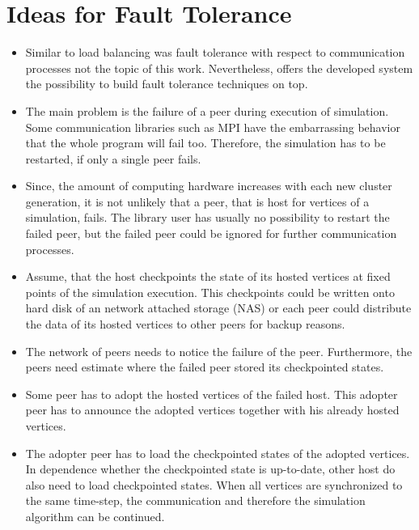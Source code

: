 \section*{Ideas for Fault Tolerance}
\begin{itemize}
\item Similar to load balancing was fault tolerance with respect to
  communication processes not the topic of this work. Nevertheless,
  offers the developed system the possibility to build fault tolerance
  techniques on top.

\item The main problem is the failure of a peer during execution of simulation.
  Some communication libraries such as MPI have the embarrassing behavior
  that the whole program will fail too. Therefore, the simulation has to be
  restarted, if only a single peer fails.

\item Since, the amount of computing hardware increases with each new
  cluster generation, it is not unlikely that a peer, that is host for
  vertices of a simulation, fails. The library user has usually no
  possibility to restart the failed peer, but the failed peer could be
  ignored for further communication processes.

\item Assume, that the host checkpoints the state of its hosted
  vertices at fixed points of the simulation execution. This
  checkpoints could be written onto hard disk of an network attached
  storage (NAS) or each peer could distribute the data of its hosted
  vertices to other peers for backup reasons.

\item The network of peers needs to notice the failure of the peer.
  Furthermore, the peers need estimate where the failed peer stored its
  checkpointed states.

\item Some peer has to adopt the hosted vertices of the failed host.
  This adopter peer has to announce the adopted vertices together
  with his already hosted vertices.

\item The adopter peer has to load the checkpointed states of the
  adopted vertices. In dependence whether the checkpointed state is
  up-to-date, other host do also need to load checkpointed
  states. When all vertices are synchronized to the same time-step,
  the communication and therefore the simulation algorithm can be
  continued.


\end{itemize}
